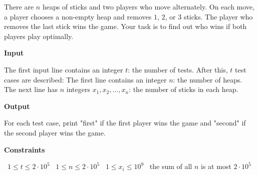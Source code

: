 There are $n$ heaps of sticks and two players who move alternately. On each move, a player chooses a non-empty heap and removes $1$, $2$, or $3$ sticks. The player who removes the last stick wins the game.
Your task is to find out who wins if both players play optimally.

\vspace{0.3cm}\noindent\textbf{Input}

The first input line contains an integer $t$: the number of tests. After this, $t$ test cases are described:
The first line contains an integer $n$: the number of heaps.
The next line has $n$ integers $x_1,x_2,\ldots,x_n$: the number of sticks in each heap.

\vspace{0.3cm}\noindent\textbf{Output}

For each test case, print "first" if the first player wins the game and "second" if the second player wins the game.

\vspace{0.3cm}\noindent\textbf{Constraints}

\textbullet\ $1 \le t \le 2 \cdot 10^5$
\textbullet\ $1 \le n \le 2 \cdot 10^5$
\textbullet\ $1 \le x_i \le 10^9$
\textbullet\ the sum of all $n$ is at most $2 \cdot 10^5$